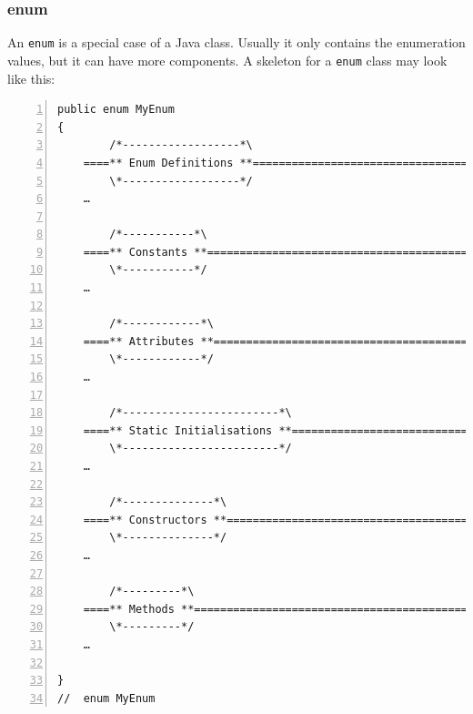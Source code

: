 \documentclass[11pt,a4paper, titlepage, parskip=half, headsepline, footsepline, cleardoublepage=current, headheight=1cm]{scrbook}
\begin{document}
\subsubsection{enum}
An \lstinline|enum| is a special case of a Java class. Usually it only contains the enumeration values, but it can have more components. A skeleton for a \lstinline|enum| class may look like this:

\begin{lstlisting}[numbers=left,caption={enum Skeleton}]
public enum MyEnum 
{
        /*------------------*\
    ====** Enum Definitions **=======================================
        \*------------------*/
    …
        
        /*-----------*\
    ====** Constants **==============================================
        \*-----------*/
    …
        
        /*------------*\
    ====** Attributes **=============================================
        \*------------*/
    …
        
        /*------------------------*\
    ====** Static Initialisations **=================================
        \*------------------------*/
    …
        
        /*--------------*\
    ====** Constructors **===========================================
        \*--------------*/
    …
        
        /*---------*\
    ====** Methods **================================================
        \*---------*/
    …
                
}
//  enum MyEnum
\end{lstlisting}
 
\end{document}
